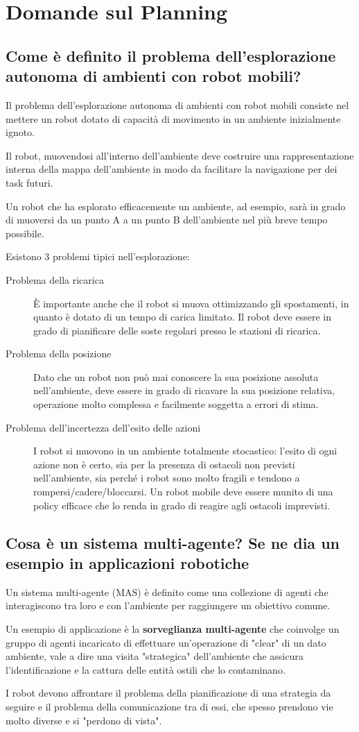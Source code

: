 \documentclass[\main/main.tex]{subfiles}
\begin{document}
\section{Domande sul Planning}

\subsection{Come è definito il problema dell'esplorazione autonoma di ambienti con robot mobili?}
Il problema dell'esplorazione autonoma di ambienti con robot mobili consiste nel mettere un robot dotato di capacità di movimento in un ambiente inizialmente ignoto.

Il robot, muovendosi all'interno dell'ambiente deve costruire una rappresentazione interna della mappa dell'ambiente in modo da facilitare la navigazione per dei task futuri.

Un robot che ha esplorato efficacemente un ambiente, ad esempio, sarà in grado di muoversi da un punto A a un punto B dell'ambiente nel più breve tempo possibile.

Esistono 3 problemi tipici nell'esplorazione:
\begin{description}
  \item[Problema della ricarica] È importante anche che il robot si muova ottimizzando gli spostamenti, in quanto è dotato di un tempo di carica limitato. Il robot deve essere in grado di pianificare delle soste regolari presso le stazioni di ricarica.
  \item[Problema della posizione] Dato che un robot non può mai conoscere la sua posizione assoluta nell'ambiente, deve essere in grado di ricavare la sua posizione relativa, operazione molto complessa e facilmente soggetta a errori di stima.
  \item[Problema dell'incertezza dell'esito delle azioni] I robot si muovono in un ambiente totalmente stocastico: l'esito di ogni azione non è certo, sia per la presenza di ostacoli non previsti nell'ambiente, sia perché i robot sono molto fragili e tendono a rompersi/cadere/bloccarsi. Un robot mobile deve essere munito di una policy efficace che lo renda in grado di reagire agli ostacoli imprevisti.
\end{description}

\subsection{Cosa è un sistema multi-agente? Se ne dia un esempio in applicazioni robotiche}
Un sistema multi-agente (MAS) è definito come una collezione di agenti che interagiscono tra loro e con l'ambiente per raggiungere un obiettivo comune.

Un esempio di applicazione è la \textbf{sorveglianza multi-agente} che coinvolge un gruppo di agenti incaricato di effettuare un'operazione di "clear" di un dato ambiente, vale a dire una visita "strategica" dell'ambiente che assicura l'identificazione e la cattura delle entità ostili che lo contaminano.

I robot devono affrontare il problema della pianificazione di una strategia da seguire e il problema della comunicazione tra di essi, che spesso prendono vie molto diverse e si "perdono di vista".
\end{document}
